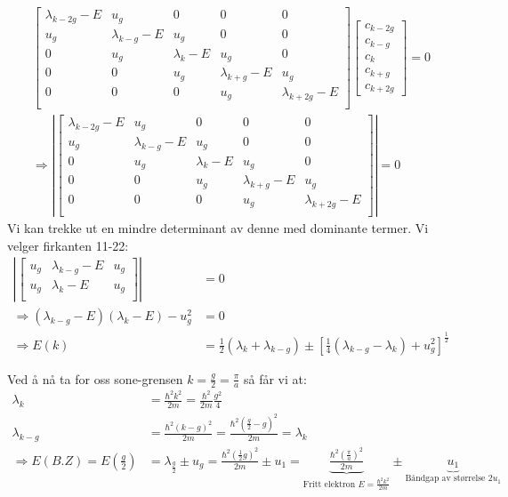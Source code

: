 \documentclass{article}
\begin{document}
\begin{align*}
  \begin{bmatrix}
    \lambda_{k-2g} - E& u_g & 0 & 0 & 0 \\
    u_g & \lambda_{k-g} - E & u_g & 0 & 0\\
   0 & u_g & \lambda_{k} - E &  u_g  & 0 \\
   0& 0 & u_g & \lambda_{k+g} - E& u_g  \\
   0& 0 & 0 & u_g & \lambda_{k+2g} - E  \\
  \end{bmatrix} \begin{bmatrix}
  c_{k-2g} \\
  c_{k - g} \\
  c_{k} \\
  c_{k+g}\\
  c_{k+2g}
  \end{bmatrix} = 0 \\
\Rightarrow \left | \begin{bmatrix}
    \lambda_{k-2g} - E& u_g & 0 & 0 & 0 \\
    u_g & \lambda_{k-g} - E & u_g & 0 & 0\\
   0 & u_g & \lambda_{k} - E &  u_g  & 0 \\
   0& 0 & u_g & \lambda_{k+g} - E& u_g  \\
   0& 0 & 0 & u_g & \lambda_{k+2g} - E  \\
  \end{bmatrix} \right | = 0
\end{align*}
Vi kan trekke ut en mindre determinant av denne med dominante termer. Vi velger firkanten 11-22:
\begin{align*}
  \left | \begin{bmatrix}
      u_g & \lambda_{k-g} - E & u_g\\
     u_g & \lambda_{k} - E &  u_g \\
    \end{bmatrix} \right | &= 0 \\
     \Rightarrow (\lambda_{k-g} - E)(\lambda_k - E) - u_g^2 &= 0 \\
     \Rightarrow E(k) &= \frac{1}{2}\left(\lambda_k + \lambda_{k-g}\right) \pm \left[\frac{1}{4}\left(\lambda_{k-g} - \lambda_k\right) +u_g^2 \right]^{\frac{1}{2}}
\end{align*}

Ved å nå ta for oss sone-grensen $k=\frac{g}{2} = \frac{\pi}{a}$ så får vi at:
\begin{align*}
  \lambda_k &= \frac{\hbar^2 k^2}{2m} = \frac{\hbar^2}{2m}\frac{g^2}{4} \\
  \lambda_{k-g} &= \frac{\hbar^2(k-g)^2}{2m} = \frac{\hbar^2 (\frac{g}{2}-g)^2}{2m} = \lambda_k \\
  \Rightarrow E(B.Z) = E\left(\frac{g}{2}\right) &= \lambda_{\frac{g}{2}} \pm u_g = \frac{\hbar^2 (\frac{1}{2}g)^2}{2m} \pm u_{1} = \underbrace{\frac{\hbar^2 \left(\frac{\pi}{a}\right)^2}{2m}}_{\text{Fritt elektron } E = \frac{\hbar^2 k^2}{2m}} \pm \underbrace{u_{1}}_{\text{Båndgap av størrelse } 2u_1}
\end{align*}
\end{document}
